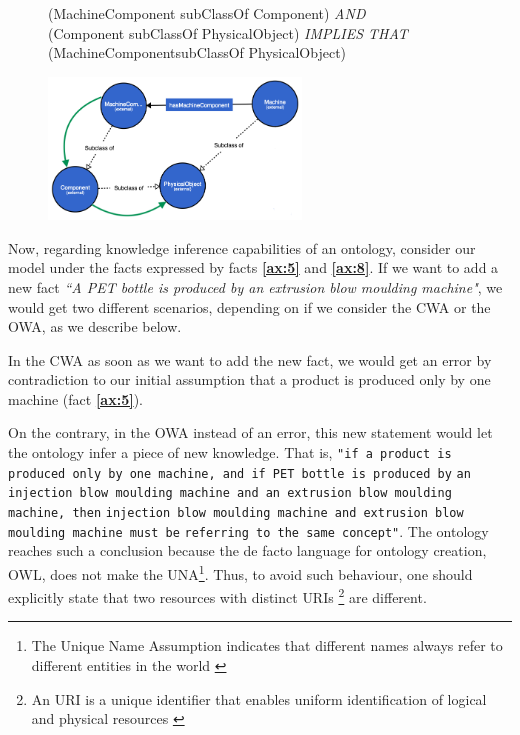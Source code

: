 \documentclass{guideline/sty/rapport}
\begin{document}
\begin{SampleEnv}
\begin{figure}[H]
\begin{mdframed}[backgroundcolor=mediumtealblue!8, linecolor=mediumtealblue]
\noindent\begin{minipage}{1\textwidth}
        (MachineComponent subClassOf Component) \textit{AND} \\
        (Component subClassOf PhysicalObject) \textit{IMPLIES THAT} \\
        (MachineComponentsubClassOf PhysicalObject)
\end{minipage}
\noindent\begin{minipage}{1\textwidth}
\centering
  \includegraphics[width=0.6\textwidth]{images/transitivityExampleInference.png}
\end{minipage}
 \end{mdframed}
\end{figure}
\label{fig:exampleMachineComponent}
\end{SampleEnv}

Now, regarding knowledge inference capabilities of an ontology, consider our model under the facts expressed by facts \textbf{\ref{ax:5}} and \textbf{\ref{ax:8}}. If we want to add a new fact  \colorbox{arsenic!10}{\textit{``A PET bottle is produced by an extrusion blow moulding machine"}}, we would get two different scenarios, depending on if we consider the \ac{CWA} or the \ac{OWA}, as we describe below. \singlespacing

In the \ac{CWA} as soon as we want to add the new fact, we would get an error by contradiction to our initial assumption that a product is produced only by one machine (fact \textbf{\ref{ax:5}}). \singlespacing
    
On the contrary, in the \ac{OWA} instead of an error, this new statement would let the ontology infer a piece of new knowledge. That is, \colorbox{magicmint!10}{\texttt{"if a product is produced only by one machine, and if PET bottle is produced by}} \colorbox{magicmint!10}{\texttt{an injection blow moulding machine and an extrusion blow moulding machine, then}} \colorbox{magicmint!10}{\texttt{injection blow moulding machine and extrusion blow moulding machine must be}} \colorbox{magicmint!10}{\texttt{referring to the same concept"}}. The ontology reaches such a conclusion because the de facto language for ontology creation, \ac{OWL}, does not make the \ac{UNA}\footnote{The Unique Name Assumption indicates that different names always refer to different entities in the world \cite{Russell16}}. Thus, to avoid such behaviour, one should explicitly state that two resources with distinct \ac{URI}s \footnote{An \ac{URI} is a unique identifier that enables uniform identification of logical and physical resources \cite{RFC3986}} are different. \singlespacing
\end{document}
